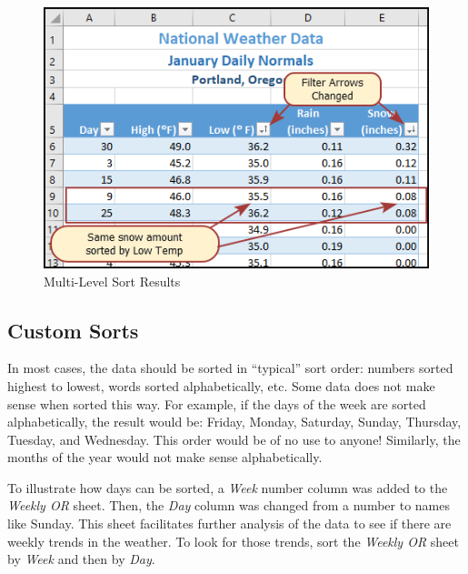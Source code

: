\begin{figure}[H]
	\centering
	\includegraphics[width=\maxwidth{.95\linewidth}]{gfx/ch05_fig12}
	\caption{Multi-Level Sort Results}
	\label{05:fig12}
\end{figure}

\subsection{Custom Sorts}

In most cases, the data should be sorted in ``typical'' sort order: numbers sorted highest to lowest, words sorted alphabetically, etc. Some data does not make sense when sorted this way. For example, if the days of the week are sorted alphabetically, the result would be: Friday, Monday, Saturday, Sunday, Thursday, Tuesday, and Wednesday. This order would be of no use to anyone! Similarly, the months of the year would not make sense alphabetically.

To illustrate how days can be sorted, a \textit{Week} number column was added to the \textit{Weekly OR} sheet. Then, the \textit{Day} column was changed from a number to names like Sunday. This sheet facilitates further analysis of the data to see if there are weekly trends in the weather. To look for those trends, sort the \textit{Weekly OR} sheet by \textit{Week} and then by \textit{Day}.

